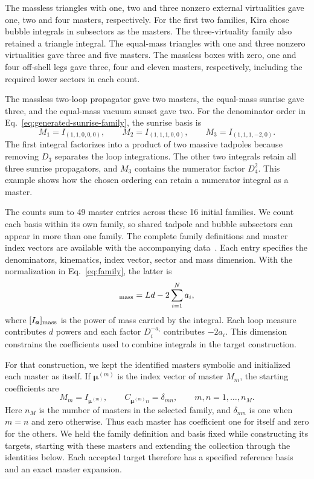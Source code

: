 \documentclass[11pt,a4paper]{article}
\begin{document}
The massless triangles with one, two and three nonzero external
virtualities gave one, two and four masters, respectively.
For the first two families, Kira chose bubble integrals in
subsectors as the masters. The three-virtuality family also
retained a triangle integral. The equal-mass triangles with
one and three nonzero virtualities gave three and five masters.
The massless boxes with zero, one and four off-shell legs gave
three, four and eleven masters, respectively, including the
required lower sectors in each count.

The massless two-loop propagator gave two masters, the equal-mass
sunrise gave three, and the equal-mass vacuum sunset gave two.
For the denominator order in
Eq.~\eqref{eq:generated-sunrise-family}, the sunrise basis is
\begin{equation}
 M_1=I_{(1,1,0,0,0)},\qquad
 M_2=I_{(1,1,1,0,0)},\qquad
 M_3=I_{(1,1,1,-2,0)}.
 \label{eq:generated-sunrise-basis}
\end{equation}
The first integral factorizes into a product of two massive
tadpoles because removing $D_3$ separates the loop integrations.
The other two integrals retain all three sunrise propagators,
and $M_3$ contains the numerator factor $D_4^2$. This example
shows how the chosen ordering can retain a numerator integral
as a master.

The counts sum to 49 master entries across these 16 initial families.
We count each basis within its own family, so shared tadpole
and bubble subsectors can appear in more than one family.
The complete family definitions and master index vectors are
available with the accompanying data~\cite{MasterIntegralData}.
Each entry specifies the denominators, kinematics, index vector,
sector and mass dimension. With the normalization in
Eq.~\eqref{eq:family}, the latter is
\begin{equation}
 [I_{\boldsymbol a}]_{\rm mass}
 =L d-2\sum_{i=1}^{N}a_i,
 \label{eq:generated-mass-dimension}
\end{equation}
where $[I_{\boldsymbol a}]_{\rm mass}$ is the power of mass
carried by the integral. Each loop measure contributes $d$
powers and each factor $D_i^{-a_i}$ contributes $-2a_i$.
This dimension constrains the coefficients used to combine
integrals in the target construction.

For that construction, we kept the identified masters symbolic
and initialized each master as itself. If
$\boldsymbol\mu^{(m)}$ is the index vector of master $M_m$,
the starting coefficients are
\begin{equation}
 M_m=I_{\boldsymbol\mu^{(m)}},
 \qquad
 C_{\boldsymbol\mu^{(m)}n}=\delta_{mn},
 \qquad m,n=1,\ldots,n_M.
 \label{eq:master-initialization}
\end{equation}
Here $n_M$ is the number of masters in the selected family,
and $\delta_{mn}$ is one when $m=n$ and zero otherwise.
Thus each master has coefficient one for itself and zero
for the others. We held the family definition and basis fixed
while constructing its targets, starting with these masters and
extending the collection through the identities below. Each accepted
target therefore has a specified reference basis and an exact master
expansion.
\end{document}
